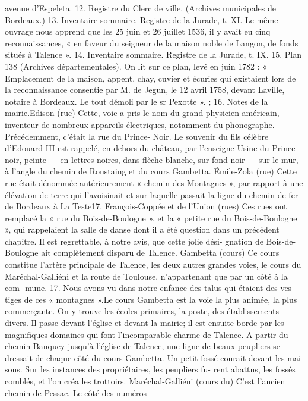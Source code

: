 \documentclass[a4paper,11pt]{book}
\begin{document}
avenue d'Espeleta.
12. Registre du Clerc de ville. (Archives municipales de Bordeaux.)
13. Inventaire sommaire. Registre de la Jurade, t. XI.
Le même ouvrage nous apprend que les 25 juin et 26 juillet 1536, il y
avait eu cinq reconnaissances, « en faveur du seigneur de la maison
noble de Langon, de fonds situés à Talence ».
14. Inventaire sommaire. Registre de la Jurade, t. IX.
15. Plan 138 (Archives départementales). On lit sur ce plan, levé en
juin 1782 : « Emplacement de la maison, appent, chay, cuvier et écuries
qui existaient lors de la reconnaissance consentie par M. de Jegun, le
12 avril 1758, devant Laville, notaire à Bordeaux. Le tout démoli par le
sr Pexotte ».
;
16. Notes de la mairie.Edison (rue)
Cette, voie a pris le nom du grand physicien américain,
inventeur de nombreux appareils électriques, notamment
du phonographe. Précédemment, c'était la rue du Prince-
Noir.
Le souvenir du fils célèbre d'Edouard III est rappelé,
en dehors du château, par l'enseigne Usine du Prince noir,
peinte — en lettres noires, dans flèche blanche, sur fond
noir — sur le mur, à l'angle du chemin de Roustaing et du
cours Gambetta.
Émile-Zola (rue)
Cette rue était dénommée antérieurement « chemin des
Montagnes », par rapport à une élévation de terre qui
l'avoisinait et sur laquelle passait la ligne du chemin de fer
de Bordeaux à La Teste17.
François-Coppée et de l'Union (rues)
Ces rues ont remplacé la « rue du Bois-de-Boulogne »,
et la « petite rue du Bois-de-Boulogne », qui rappelaient
la salle de danse dont il a été question dans un précédent
chapitre. Il est regrettable, à notre avis, que cette jolie dési-
gnation de Bois-de-Boulogne ait complètement disparu de
Talence.
Gambetta (cours)
Ce cours constitue l'artère principale de Talence, les deux
autres grandes voies, le cours du Maréchal-Galliéni et la
route de Toulouse, n'appartenant que par un côté à la com-
mune.
17. Nous avons vu dans notre enfance des talus qui étaient des ves-
tiges de ces « montagnes ».Le cours Gambetta est la voie la plus animée, la plus
commerçante. On y trouve les écoles primaires, la poste,
des établissements divers. Il passe devant l'église et devant
la mairie; il est ensuite borde par les magnifiques domaines
qui font l'incomparable charme de Talence.
A partir du chemin Banquey jusqu'à l'église de Talence,
une ligne de beaux peupliers se dressait de chaque côté
du cours Gambetta. Un petit fossé courait devant les mai-
sons. Sur les instances des propriétaires, les peupliers fu-
rent abattus, les fossés comblés, et l'on créa les trottoirs.
Maréchal-Galliéni (cours du)
C'est l'ancien chemin de Pessac. Le côté des numéros
\end{document}
